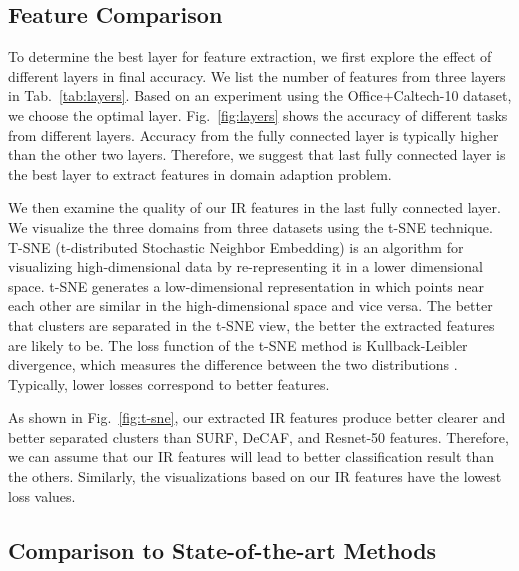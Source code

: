 \documentclass[10pt, conference, compsocconf]{IEEEtran}
\begin{document}
\subsection{Feature Comparison} \label{sec:fea_c}

To determine the best layer for feature extraction, we first explore the effect of different layers in final accuracy.  We list the number of features from three layers in Tab.~\ref{tab:layers}. Based on an experiment using the Office+Caltech-10 dataset, we choose the optimal layer. Fig.~\ref{fig:layers} shows the accuracy of different tasks from different layers. Accuracy from the fully connected layer is typically higher than the other two layers. Therefore, we suggest that last fully connected layer is the best layer to extract features in domain adaption problem.

We then examine the quality of our IR features in the last fully connected layer. 
We visualize the three domains from three datasets using the t-SNE technique. T-SNE (t-distributed Stochastic Neighbor Embedding) \cite{maaten2008visualizing} is an algorithm for visualizing high-dimensional data by re-representing it in a lower dimensional space. 
t-SNE generates a low-dimensional representation in which points near each other are similar in the high-dimensional space and vice versa.
The better that clusters are separated in the t-SNE view, the better the extracted features are likely to be. 
The loss function of the t-SNE method is  Kullback-Leibler divergence, which measures the difference between the two distributions \cite{maaten2008visualizing}. 
Typically, lower losses correspond to better features.


As shown in Fig.~\ref{fig:t-sne}, our extracted IR features produce better clearer and better separated clusters
than SURF, DeCAF, and Resnet-50 features. Therefore, we can assume that our IR features will lead to better classification result than the others. Similarly, the visualizations based on our IR features have the lowest loss values.

\subsection{Comparison to State-of-the-art Methods}
\end{document}
